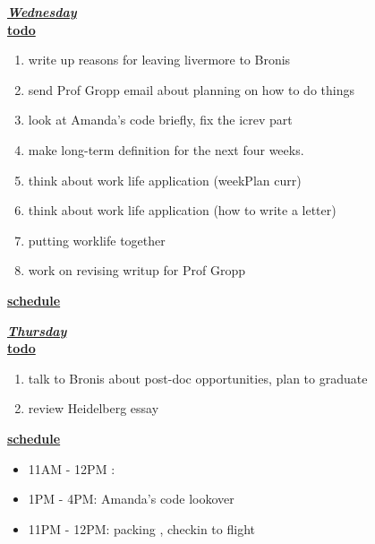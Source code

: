 \underline{\textbf{\textit{Wednesday}}}\\
\underline{\textbf{todo}}\\
\begin{enumerate}
\item write up reasons for leaving livermore to Bronis  
\item send Prof Gropp email about planning on how to do things  
\item look at Amanda's code briefly, fix the icrev part    
\item make long-term definition for the next four weeks.
\item think about work life application (weekPlan curr)
\item think about work life application (how to write a letter)
\item putting worklife together \timeEst{}
\item work on revising writup for Prof Gropp
\end{enumerate}

\underline{\textbf{schedule}}\\
\begin{itemize}
\end{itemize}

\underline{\textbf{\textit{Thursday}}}\\

\underline{\textbf{todo}}\\
\begin{enumerate}
\item talk to Bronis about post-doc opportunities, plan to graduate 
\item review Heidelberg essay 
\end{enumerate}

\underline{\textbf{schedule}}\\
\begin{itemize}
\item 11AM - 12PM :
\item 1PM - 4PM: Amanda's code lookover
\item 11PM - 12PM: packing , checkin to flight
\end{itemize}

